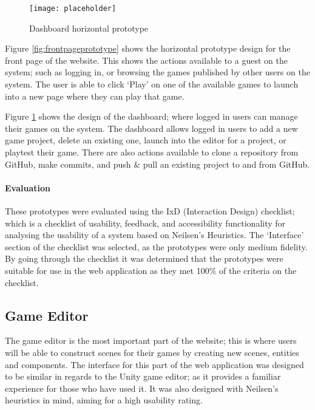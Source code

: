 	\begin{figure}[h]
		\centering
		\texttt{[image: placeholder]}
		\caption{Dashboard horizontal prototype}
		\label{fig:dashboardprototype}
	\end{figure}

	Figure \ref{fig:frontpageprototype} shows the horizontal prototype design for the front page of the website. This shows the actions available to a guest on the system; such as logging in, or browsing the games published by other users on the system. The user is able to click `Play' on one of the available games to launch into a new page where they can play that game.

	Figure \ref{fig:dashboardprototype} shows the design of the dashboard; where logged in users can manage their games on the system. The dashboard allows logged in users to add a new game project, delete an existing one, launch into the editor for a project, or playtest their game. There are also actions available to clone a repository from GitHub, make commits, and push \& pull an existing project to and from GitHub.

	\paragraph{Evaluation}
	These prototypes were evaluated using the IxD (Interaction Design) checklist; which is a checklist of usability, feedback, and accessibility functionality for analysing the usability of a system based on Neilsen's Heuristics. The `Interface' section of the checklist was selected, as the prototypes were only medium fidelity. By going through the checklist it was determined that the prototypes were suitable for use in the web application as they met 100\% of the criteria on the checklist.



	\subsection{Game Editor}
	The game editor is the most important part of the website; this is where users will be able to construct scenes for their games by creating new scenes, entities and components. The interface for this part of the web application was designed to be similar in regards to the Unity game editor; as it provides a familiar experience for those who have used it. It was also designed with Neilsen's heuristics in mind, aiming for a high usability rating.

